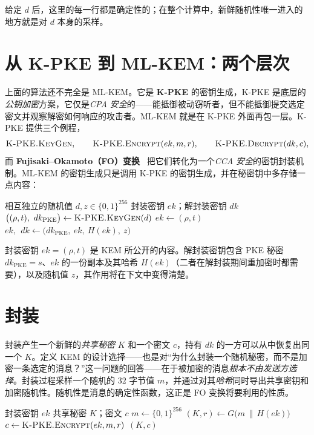 给定 $d$ 后，这里的每一行都是确定性的；在整个计算中，新鲜随机性唯一进入的地方就是对 $d$ 本身的采样。

\section{从 K-PKE 到 ML-KEM：两个层次}

上面的算法还不完全是 ML-KEM。它是 \textbf{K-PKE} 的密钥生成，K-PKE 是底层的\emph{公钥加密}方案，它仅是\emph{CPA 安全}的——能抵御被动窃听者，但不能抵御提交选定密文并观察解密如何响应的攻击者。ML-KEM 就是在 K-PKE 外面再包一层。K-PKE 提供三个例程，
\[
\textsc{K-PKE.KeyGen},\qquad \textsc{K-PKE.Encrypt}(ek, m, r),\qquad \textsc{K-PKE.Decrypt}(dk, c),
\]
而 \textbf{Fujisaki--Okamoto（FO）变换}~\cite{fo1999} 把它们转化为一个\emph{CCA 安全}的密钥封装机制。ML-KEM 的密钥生成只是调用 K-PKE 的密钥生成，并在秘密钥中多存储一点内容：

\begin{algorithm}[H]
\caption{ML-KEM.KeyGen（教学形式）}
\label{alg:mlkem-keygen}
\begin{algorithmic}[1]
\Require 相互独立的随机值 $d,z \in \{0,1\}^{256}$
\Ensure 封装密钥 $ek$；解封装密钥 $dk$
\State $\big((\rho,t),\ dk_{\mathrm{PKE}}\big) \gets \textsc{K-PKE.KeyGen}(d)$ 
\State $ek \gets (\rho, t)$
\State \Return $ek,\ \ dk \gets \big(dk_{\mathrm{PKE}},\ ek,\ H(ek),\ z\big)$
\end{algorithmic}
\end{algorithm}

封装密钥 $ek=(\rho,t)$ 是 KEM 所公开的内容。解封装密钥包含 PKE 秘密 $dk_{\mathrm{PKE}}=s$、$ek$ 的一份副本及其哈希 $H(ek)$（二者在解封装期间重加密时都需要），以及随机值 $z$，其作用将在下文中变得清楚。

\section{封装}

封装产生一个新鲜的\emph{共享秘密} $K$ 和一个密文 $c$，持有 $dk$ 的一方可以从中恢复出同一个 $K$。定义 KEM 的设计选择——也是对“为什么封装一个随机秘密，而不是加密一条选定的消息？”这一问题的回答——在于被加密的消息\emph{根本不由发送方选择}。封装过程采样一个随机的 $32$ 字节值 $m$，并通过对其\emph{哈希}同时导出共享密钥和加密随机性。随机性是消息的确定性函数，这正是 FO 变换将要利用的性质。

\begin{algorithm}[H]
\caption{ML-KEM.Encaps（教学形式）}
\label{alg:mlkem-encaps}
\begin{algorithmic}[1]
\Require 封装密钥 $ek$
\Ensure 共享秘密 $K$；密文 $c$
\State $m \gets \{0,1\}^{256}$ 
\State $(K, r) \gets G\big(m \,\|\, H(ek)\big)$ 
\State $c \gets \textsc{K-PKE.Encrypt}(ek, m, r)$
\State \Return $(K, c)$
\end{algorithmic}
\end{algorithm}

